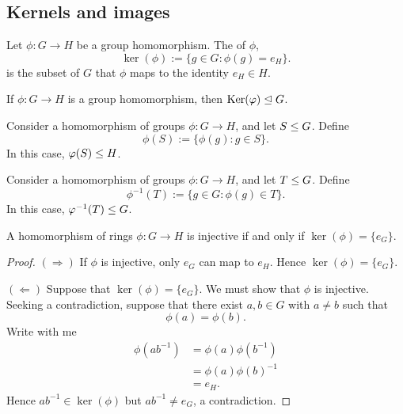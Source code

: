 \documentclass{ximera}
\begin{document}
\subsection{Kernels and images}



\begin{definition}
  Let $\phi:G\to H$ be a group homomorphism. The  of
  $\phi$,
  \[
  \ker(\phi) := \{g\in G: \phi(g) = e_H\}.
  \]
  is the subset of $G$ that $\phi$ maps to the identity $e_H\in H$.
\end{definition}


\begin{lemma}\label{L:kerN}
  If $\phi:G\to H$ is a group homomorphism, then $\mathop{\mathrm{Ker}}\nolimits(\varphi)\trianglelefteq G$.
\end{lemma}

\begin{lemma}\label{L:hps}
  Consider a homomorphism of groups $\phi:G\to H$, and let $S\leq
  G$. Define
  \[
  \phi(S) := \{\phi(g): g\in S\}.
  \]
  In this case, $\varphi(S) \leq H$.
\end{lemma}


\begin{lemma}\label{L:pps}
  Consider a homomorphism of groups $\phi:G\to H$, and let $T\leq
  G$. Define
  \[
  \phi^{-1}(T) := \{g\in G: \phi(g)\in T\}.
  \]
  In this case, $\varphi^{-1}(T) \leq G$.
\end{lemma}



\begin{lemma}
  A homomorphism of rings $\phi:G\to H$ is injective if and only if
  $\ker(\phi) = \{e_G\}$.
  \begin{proof}
    $(\Rightarrow)$ If $\phi$ is injective, only $e_G$ can map to
    $e_H$. Hence $\ker(\phi) = \{e_G\}$.


    $(\Leftarrow)$ Suppose that $\ker(\phi) = \{e_G\}$. We must show
    that $\phi$ is injective. Seeking a contradiction, suppose that
    there exist $a,b\in G$ with $a\ne b$ such that
    \[
    \phi(a) = \phi(b).
    \]
    Write with me
    \begin{align*}
      \phi(ab^{-1}) &=\phi(a)\phi(b^{-1})\\
      &= \phi(a) \phi(b)^{-1}\\
      &= e_H.
    \end{align*}
    Hence $ab^{-1}\in\ker(\phi)$ but $ab^{-1}\ne e_G$, a
    contradiction.
  \end{proof}
\end{lemma}
\end{document}
